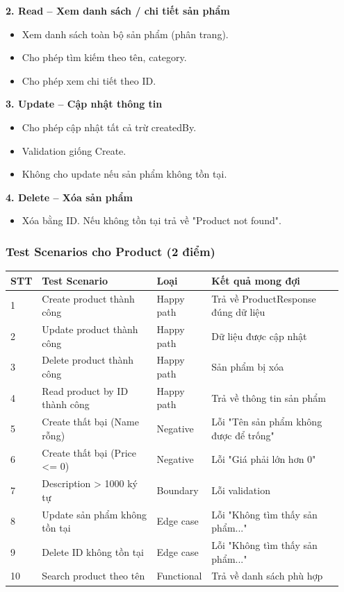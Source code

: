 \documentclass[a4paper,12pt]{article}
\begin{document}
\textbf{2. Read -- Xem danh sách / chi tiết sản phẩm}
\begin{itemize}
    \item Xem danh sách toàn bộ sản phẩm (phân trang).
    \item Cho phép tìm kiếm theo tên, category.
    \item Cho phép xem chi tiết theo ID.
\end{itemize}

\textbf{3. Update -- Cập nhật thông tin}
\begin{itemize}
    \item Cho phép cập nhật tất cả trừ createdBy.
    \item Validation giống Create.
    \item Không cho update nếu sản phẩm không tồn tại.
\end{itemize}

\textbf{4. Delete -- Xóa sản phẩm}
\begin{itemize}
    \item Xóa bằng ID. Nếu không tồn tại trả về "Product not found".
\end{itemize}

\subsubsection{Test Scenarios cho Product (2 điểm)}
\begin{longtable}{|p{0.05\linewidth}|p{0.35\linewidth}|p{0.15\linewidth}|p{0.4\linewidth}|}
\hline
\textbf{STT} & \textbf{Test Scenario} & \textbf{Loại} & \textbf{Kết quả mong đợi} \\
\hline
1 & Create product thành công & Happy path & Trả về ProductResponse đúng dữ liệu \\ \hline
2 & Update product thành công & Happy path & Dữ liệu được cập nhật \\ \hline
3 & Delete product thành công & Happy path & Sản phẩm bị xóa \\ \hline
4 & Read product by ID thành công & Happy path & Trả về thông tin sản phẩm \\ \hline
5 & Create thất bại (Name rỗng) & Negative & Lỗi "Tên sản phẩm không được để trống" \\ \hline
6 & Create thất bại (Price <= 0) & Negative & Lỗi "Giá phải lớn hơn 0" \\ \hline
7 & Description > 1000 ký tự & Boundary & Lỗi validation \\ \hline
8 & Update sản phẩm không tồn tại & Edge case & Lỗi "Không tìm thấy sản phẩm..." \\ \hline
9 & Delete ID không tồn tại & Edge case & Lỗi "Không tìm thấy sản phẩm..." \\ \hline
10 & Search product theo tên & Functional & Trả về danh sách phù hợp \\ \hline
\end{longtable}
\end{document}
